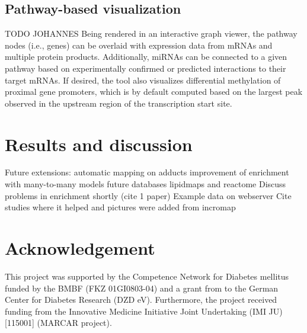\documentclass[final,5p,times,twocolumn]{elsarticle}
\begin{document}
\subsection{Pathway-based visualization}
TODO JOHANNES
Being rendered in an interactive graph viewer, the pathway nodes (i.e., genes) can be overlaid with expression data from mRNAs and multiple protein products. Additionally, miRNAs can be connected to a given pathway based on experimentally confirmed or predicted interactions to their target mRNAs. If desired, the tool also visualizes differential methylation of proximal gene promoters, which is by default computed based on the largest peak observed in the upstream region of the transcription start site.


\section{Results and discussion}

Future extensions: automatic mapping on adducts
improvement of enrichment with many-to-many models
future databases lipidmaps\cite{Sud2007} and reactome \cite{Eustachio2011}
Discuss problems in enrichment shortly (cite 1 paper)
Example data on webserver
Cite studies where it helped and pictures were added from incromap

\section{Acknowledgement}
This project was supported by the Competence Network for Diabetes mellitus funded
by the BMBF (FKZ 01GI0803-04) and a grant from to the German Center for Diabetes Research (DZD eV). Furthermore, the project received funding from the Innovative Medicine Initiative Joint Undertaking (IMI JU) [115001] (MARCAR project).














\end{document}
